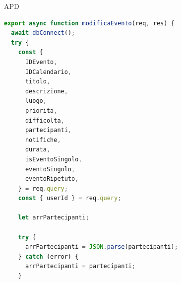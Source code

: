 \begin{listaPersonale} {APD}
\begin{listaPersonale2}[APD]{}

                \begin{lstlisting}[language=JavaScript]
export async function modificaEvento(req, res) {
  await dbConnect();
  try {
    const {
      IDEvento,
      IDCalendario,
      titolo,
      descrizione,
      luogo,
      priorita,
      difficolta,
      partecipanti,
      notifiche,
      durata,
      isEventoSingolo,
      eventoSingolo,
      eventoRipetuto,
    } = req.query;
    const { userId } = req.query;

    let arrPartecipanti;

    try {
      arrPartecipanti = JSON.parse(partecipanti);
    } catch (error) {
      arrPartecipanti = partecipanti;
    }


\end{lstlisting}
\end{listaPersonale2}
\end{listaPersonale}
